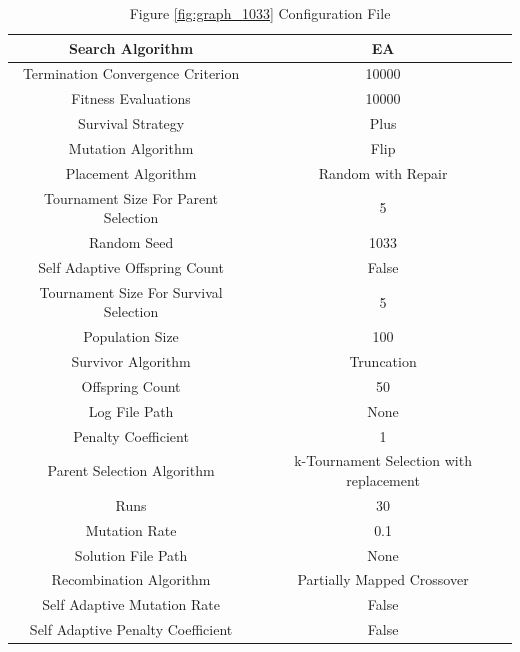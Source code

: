 \documentclass{standalone}
\begin{document}
\begin{table}[!htb]
	\centering
	\caption{Figure \ref{fig:graph_1033} Configuration File}
	\label{tab:graph_1033}
	\begin{tabular}{| c | c |}
		\hline
		Search Algorithm		& EA		 \\
		\hline
		Termination Convergence Criterion		& 10000		 \\
		\hline
		Fitness Evaluations		& 10000		 \\
		\hline
		Survival Strategy		& Plus		 \\
		\hline
		Mutation Algorithm		& Flip		 \\
		\hline
		Placement Algorithm		& Random with Repair		 \\
		\hline
		Tournament Size For Parent Selection		& 5		 \\
		\hline
		Random Seed		& 1033		 \\
		\hline
		Self Adaptive Offspring Count		& False		 \\
		\hline
		Tournament Size For Survival Selection		& 5		 \\
		\hline
		Population Size		& 100		 \\
		\hline
		Survivor Algorithm		& Truncation		 \\
		\hline
		Offspring Count		& 50		 \\
		\hline
		Log File Path		& None		 \\
		\hline
		Penalty Coefficient		& 1		 \\
		\hline
		Parent Selection Algorithm		& k-Tournament Selection with replacement		 \\
		\hline
		Runs		& 30		 \\
		\hline
		Mutation Rate		& 0.1		 \\
		\hline
		Solution File Path		& None		 \\
		\hline
		Recombination Algorithm		& Partially Mapped Crossover		 \\
		\hline
		Self Adaptive Mutation Rate		& False		 \\
		\hline
		Self Adaptive Penalty Coefficient		& False		 \\
		\hline
	\end{tabular}
\end{table}
\end{document}
